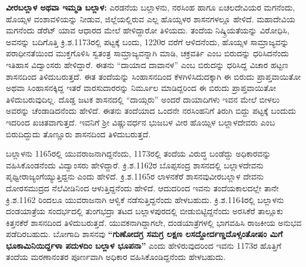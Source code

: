 \textbf{ವೀರಬಲ್ಲಾಳ ಅಥವಾ ಇಮ್ಮಡಿ ಬಲ್ಲಾಳ:} ಎರಡನೆಯ ಬಲ್ಲಾಳನು, ನರಸಿಂಹ ಹಾಗೂ ಏಚಲದೇವಿಯರ ಮಗನೆಂದು, ಹೊಯ್ಸಳ ವಂಶಾವಳಿಯನ್ನು ನೀಡುವ, ಜಿಲ್ಲೆಯಲ್ಲಿರುವ ಎಲ್ಲ ಹೊಯ್ಸಳರ ಶಾಸನಗಳಲ್ಲೂ ಹೇಳಿದೆ. ಮಹಾದೇವಿಯ ಮಗನೆಂದು ಡೆರೆಟ್​ ಯಾವ ಆಧಾರದ ಮೇಲೆ ಹೇಳಿದ್ದಾರೋ ತಿಳಿಯದು. ತಂದೆಯ ನಿಷ್ಕ್ರಿಯತೆಯನ್ನು ವಿರೋಧಿಸಿ, ಅವನನ್ನು ಬದಿಗೊತ್ತಿ ಕ್ರಿ.ಶ.1173ರಲ್ಲಿ ಪಟ್ಟಕ್ಕೆ ಬಂದು, 1220ರ ವರೆಗೆ ಆಳಿದನೆಂದು, ಹೊಯ್ಸಳ ಸಾಮ್ರಾಜ್ಯವನ್ನು ಪರಾಧೀನತೆಯಿಂದ ಮುಕ್ತಗೊಳಿಸಿ ಸ್ವತಂತ್ರ ಸಾಮ್ರಾಜ್ಯವನ್ನಾಗಿ ಮಾಡಿ, ಚಕ್ರವರ್ತಿ ಎಂಬ ಬಿರುದನ್ನು ಧರಿಸಿದನೆಂದು ಇತಿಹಾಸ ವಿದ್ವಾಂಸರು ಹೇಳಿದ್ದಾರೆ. ಈತನು “ದಾಯಾದ ದಾವಾನಳ” ಎಂಬ ಬಿರುದನ್ನು ಧರಿಸಿದ್ದ ವಿಚಾರ ಹಟ್ಟಣ ಶಾಸನದಿಂದ ತಿಳಿದುಬರುತ್ತದೆ. ಈತ ತಂದೆಯನ್ನು ಸಿಂಹಾಸನದಿಂದ ಕೆಳಗಿಳಿಸಿದುದಕ್ಕಾಗಿ ಈ ಬಿರುದು ಪ್ರಾಪ್ತವಾಯಿತೋ ಅಥವಾ ಸಿಂಹಾಸನಕ್ಕಿದ್ದ ಇತರೆ ವಾರಸುದಾರರನ್ನು ನಿರ್ಮೂಲ ಮಾಡಿದ್ದರಿಂದ ಈ ಬಿರುದು ಪ್ರಾಪ್ತವಾಯಿತೋ ತಿಳಿದುಬರುವುದಿಲ್ಲ. ದೊಡ್ಡ ಜಟಕ ಶಾಸನದಲ್ಲಿ “ದಾಯ್ಗರು” ಅಂದರೆ ದಾಯಾದಿಗಳು ಇವನ ಮೇಲೆ ಬೀಳಲು ಅವರನ್ನು ಚೆಂಡಾಡಿದನೆಂದು ಹೇಳಿದೆ. ಈತನು ತಂದೆಯಾದ ಒಂದನೇ ನರಸಿಂಹನಿಗೆ ತಿರುಗಿ ಬಿದ್ದು ಪಟ್ಟಕ್ಕೆ ಬಂದುದು ಇದರಿಂದ ಖಚಿತವಾಗುತ್ತದೆ. ಇವನಿಗೆ ಶ‍್ರೀ ವಿಷ್ಣುವರ್ಧನ ಭುಜಬಳ ವೀರ ಹೊಯ್ಸಿಳ ಬಲ್ಲಾಳದೇವರು ಎಂಬ ಬಿರುದಿದ್ದುದು ತೊಣ್ಣೂರು ಶಾಸನದಿಂದ ತಿಳಿದುಬರುತ್ತದೆ.

ಬಲ್ಲಾಳನು 1165ರಲ್ಲಿ ಯುವರಾಜನಾಗಿದ್ದನೆಂದು, 1173ರಲ್ಲಿ ತಂದೆಯ ವಿರುದ್ಧ ಬಂಡೆದ್ದು ಅಧಿಕಾರವನ್ನು ವಹಿಸಿಕೊಂಡ\-ನೆಂದು ವಿದ್ವಾಂಸರು ಹೇಳಿದ್ದಾರೆ. ಕ್ರಿ.ಶ.1162ರ ಬೊಪ್ಪಸಂದ್ರ ಶಾಸನದಲ್ಲಿ ಬಲ್ಲಾಳದೇವನು ಪೃಥ್ವೀರಾಜ್ಯಂ\-ಗೆಯ್ಯುತ್ತಿದ್ದನು ಎಂದು ಹೇಳಿದೆ. ಕ್ರಿ.ಶ.1165ರ ಲಾಳನಕೆರೆ ಶಾಸನವುವೀರಬಲ್ಲಾಳ ದೇವನು ದೋರಸಮುದ್ರದ ನೆಲೆವೀಡಿನಿಂದ ಆಳುತ್ತಿದ್ದನೆಂದು ಹೇಳಿದೆ. ಆದುದರಿಂದ ಇವನು ತಂದೆಯಕಾಲದಲ್ಲೇ ತಾನೇ ಕ್ರಿ.ಶ.1162 ರಿಂದಲೂ ಯುವರಾಜನಾಗಿ ಆಳ್ವಿಕೆ ನಡೆಸುತ್ತಿದ್ದನೆಂದು ಹೇಳಬಹುದು. ಕ್ರಿ.ಶ.1164ರಲ್ಲಿ ಬಲ್ಲಾಳನು ದಂಡಯಾತ್ರೆಯ ಸಂದರ್ಭದಲ್ಲಿ ತುಂಗಭದ್ರಾ ತಟದ ಬಲ್ಲಾಳಪುರದಲ್ಲಿ ಬೀಡುಬಿಟ್ಟಿದ್ದನೆಂದು ಅರಸಿಕೆರೆ ತಾಲ್ಲೂಕು ಕಿತ್ತನಕೆರೆ ಶಾಸನದಿಂದ ತಿಳಿದುಬರುತ್ತದೆ. ಯುವಕನಾಗಿದ್ದಾಗಲೇ, ದಂಡಯಾತ್ರೆಗಳಲ್ಲಿ ಭಾಗವಹಿಸಿ ರಾಜಕೀಯ ಅನುಭವ ಪಡೆದಿರಬಹುದು. ಬೋಗಾದಿ ಶಾಸನವು \textbf{“ಗುಣೋದಗ್ರ ಸಮಗ್ರ ಲಕ್ಷಣ ಲಸದ್ದೋರ್ದಣ್ಡದೊಳ್ಸಂತೋಷಂ ಮಿಗೆ ಭೂಕಾಮಿನಿಯಿರ್ದ್ದಳಾ ಪದುಳದಿಂ ಬಲ್ಲಾಳ ಭೂಪನಾ”} ಎಂದು ಹೇಳಿರುವುದರಿಂದ ಇವನು 1173ರ ಹೊತ್ತಿಗೆ ತಂದೆಯ ಮರಣಾನಂತರ ಪೂರ್ಣವಾಗಿ ಅಧಿಕಾರ ವಹಿಸಿಕೊಂಡಿದ್ದನೆಂದು ಹೇಳಬಹುದು.

